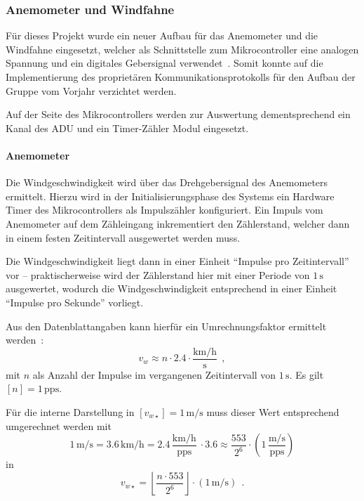         \subsubsection{Anemometer und Windfahne}\label{ssec:Wind}
            Für dieses Projekt wurde ein neuer Aufbau für das Anemometer und die Windfahne eingesetzt, welcher als Schnittstelle zum Mikrocontroller eine analogen Spannung und ein digitales Gebersignal verwendet~\cite{ds_wind}. Somit konnte auf die Implementierung des proprietären Kommunikationsprotokolls für den Aufbau der Gruppe vom Vorjahr verzichtet werden.
            
            Auf der Seite des Mikrocontrollers werden zur Auswertung dementsprechend ein Kanal des ADU und ein Timer-Zähler Modul eingesetzt.
            
            \paragraph{Anemometer}
            Die Windgeschwindigkeit wird über das Drehgebersignal des Anemometers ermittelt. Hierzu wird in der Initialisierungsphase des Systems ein Hardware Timer des Mikrocontrollers als Impulszähler konfiguriert. Ein Impuls vom Anemometer auf dem Zähleingang inkrementiert den Zählerstand, welcher dann in einem festen Zeitintervall ausgewertet werden muss.
            
            Die Windgeschwindigkeit liegt dann in einer Einheit ``Impulse pro Zeitintervall'' vor -- praktischerweise wird der Zählerstand hier mit einer Periode von $1\,\mathrm{s}$ ausgewertet, wodurch die Windgeschwindigkeit entsprechend in einer Einheit ``Impulse pro Sekunde'' vorliegt.
            
            Aus den Datenblattangaben kann hierfür ein Umrechnungsfaktor ermittelt werden~\cite{ds_wind}: 
            \begin{equation*}
                v_w \approx n \cdot 2.4 \cdot \frac{\mathrm{km/h}}{\mathrm{s}}~~,
            \end{equation*}
            mit $n$ als Anzahl der Impulse im vergangenen Zeitintervall von $1\,\mathrm{s}$. Es gilt $[n] = 1\,\mathrm{pps}$.
        
            Für die interne Darstellung in $[v_{w\star}] = 1\,\mathrm{m/s}$ muss dieser Wert entsprechend umgerechnet werden mit
            \begin{equation*}
                1\,\mathrm{m/s} = 3.6\,\mathrm{km/h} = 2.4\,\frac{\mathrm{km/h}}{\mathrm{pps}}\ \cdot 3.6 \approx \frac{553}{2^6}\cdot\left(1\,\frac{\mathrm{m/s}}{\mathrm{pps}}\right)
            \end{equation*}
            in
            \begin{equation*}
                v_{w\star} = \left\lfloor\frac{n \cdot 553}{2^6}\right\rfloor \cdot (1\,\mathrm{m/s})~~.
            \end{equation*}
        
